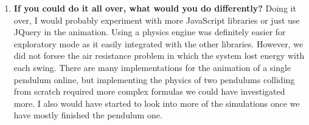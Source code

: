 \begin{enumerate}
    \item \textbf{If you could do it all over, what would you do differently?}
    Doing it over, I would probably experiment with more JavaScript libraries or just use JQuery in the animation. Using a physics engine was definitely easier for exploratory mode as it easily integrated with the other libraries. However, we did not forsee the air resistance problem in which the system lost energy with each swing. There are many implementations for the animation of a single pendulum online, but implementing the physics of two pendulums colliding from scratch required more complex formulas we could have investigated more. I also would have started to look into more of the simulations once we have mostly finished the pendulum one. 

\end{enumerate}

